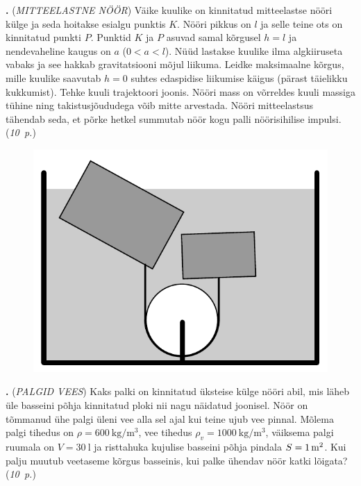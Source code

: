 \documentclass[11pt,a5paper]{article}
\newcommand{\numb}[1]{\vspace{5pt}\textbf{\large #1}}
\newcommand{\nimi}[1]{(\textsl{\small #1})}
\newcommand{\punktid}[1]{(\emph{#1~p.})}
\newcounter{ylesanne}
\newcommand{\yl}[1]{\addtocounter{ylesanne}{1}\numb{\theylesanne.} \nimi{#1} \newblock{}}
\newcommand{\autor}[1]{}%
\begin{document}
\yl{MITTEELASTNE NÖÖR} Väike kuulike on kinnitatud mitteelastse nööri külge ja seda hoitakse esialgu punktis $K$. Nööri pikkus on $l$ ja selle teine ots on kinnitatud punkti $P$. Punktid $K$ ja $P$ asuvad samal kõrgusel $h=l$ ja nendevaheline kaugus on $a$ ($0<a<l$). Nüüd lastakse kuulike ilma algkiiruseta vabaks ja see hakkab gravitatsiooni mõjul liikuma. Leidke maksimaalne kõrgus, mille kuulike saavutab $h=0$ suhtes edaspidise liikumise käigus (pärast täielikku kukkumist). Tehke kuuli trajektoori joonis. Nööri mass on võrreldes kuuli massiga tühine ning takistusjõududega võib mitte arvestada. Nööri mitteelastsus tähendab seda, et põrke hetkel summutab nöör kogu palli nöörisihilise impulsi.
\punktid{10} \autor{Päivo Simson}

\begin{figure}
  \vspace{-25pt}
  \begin{center}
  \includegraphics[scale=0.3]{palgid.pdf}
  \vspace{-20pt}
  \end{center}
\end{figure}

\yl{PALGID VEES} Kaks palki on kinnitatud üksteise külge nööri abil, mis läheb üle basseini põhja kinnitatud ploki nii nagu näidatud joonisel. Nöör on tõmmanud ühe palgi üleni vee alla sel ajal kui teine ujub vee pinnal. Mõlema palgi tihedus on $\rho=\SI {600}{\kg \per\m\cubed}$, vee tihedus $\rho_v=\SI{1000}{\kg\per\m\cubed}$, väiksema palgi ruumala on $V=\SI{30}\litre$ ja risttahuka kujulise basseini põhja pindala  $S=\SI{1}{m\squared}$. Kui palju muutub veetaseme kõrgus basseinis, kui palke ühendav nöör katki lõigata?
\punktid{10} \autor{Jaan Kalda}
\end{document}
